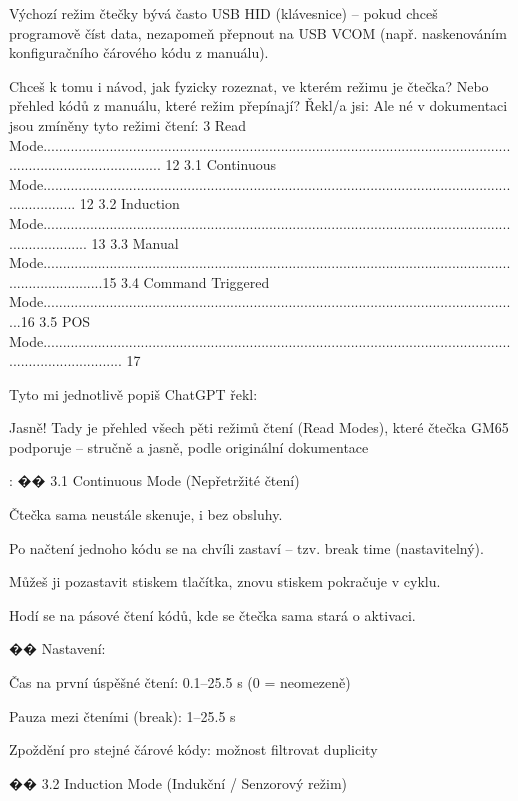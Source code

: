 Výchozí režim čtečky bývá často USB HID (klávesnice) – pokud chceš programově číst data, nezapomeň přepnout na USB VCOM (např. naskenováním konfiguračního čárového kódu z manuálu).

Chceš k tomu i návod, jak fyzicky rozeznat, ve kterém režimu je čtečka? Nebo přehled kódů z manuálu, které režim přepínají?
Řekl/a jsi:
Ale né v dokumentaci jsou zmíněny tyto režimi čtení: 
3 Read Mode............................................................................................................................................................... 12
3.1 Continuous Mode......................................................................................................................................... 12
3.2 Induction Mode............................................................................................................................................ 13
3.3 Manual Mode................................................................................................................................................15
3.4 Command Triggered Mode...........................................................................................................................16
3.5 POS Mode..................................................................................................................................................... 17

Tyto mi jednotlivě popiš
ChatGPT řekl:

Jasně! Tady je přehled všech pěti režimů čtení (Read Modes), které čtečka GM65 podporuje – stručně a jasně, podle originální dokumentace​

:
�� 3.1 Continuous Mode (Nepřetržité čtení)

    Čtečka sama neustále skenuje, i bez obsluhy.

    Po načtení jednoho kódu se na chvíli zastaví – tzv. break time (nastavitelný).

    Můžeš ji pozastavit stiskem tlačítka, znovu stiskem pokračuje v cyklu.

    Hodí se na pásové čtení kódů, kde se čtečka sama stará o aktivaci.

��️ Nastavení:

    Čas na první úspěšné čtení: 0.1–25.5 s (0 = neomezeně)

    Pauza mezi čteními (break): 1–25.5 s

    Zpoždění pro stejné čárové kódy: možnost filtrovat duplicity

��️ 3.2 Induction Mode (Indukční / Senzorový režim)

